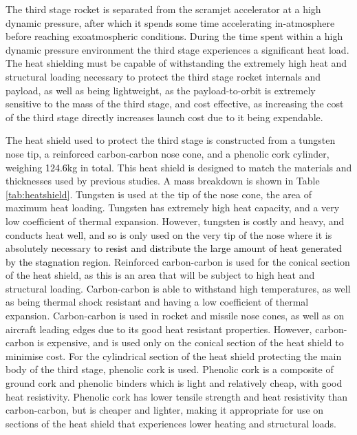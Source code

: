 The third stage rocket is separated from the scramjet accelerator at a high dynamic pressure, after which it spends some time accelerating in-atmosphere before reaching exoatmospheric conditions. During the time spent within a high dynamic pressure environment the third stage experiences a significant heat load. The heat shielding must be capable of withstanding the extremely high heat and structural loading necessary to protect the third stage rocket internals and payload, as well as being lightweight, as the payload-to-orbit is extremely sensitive to the mass of the third stage, and cost effective, as increasing the cost of the third stage directly increases launch cost due to it being expendable. 


The heat shield used to protect the third stage is constructed from a tungsten nose tip, a reinforced carbon-carbon nose cone, and a phenolic cork cylinder, weighing \textcolor{black}{124.6}kg in total. This heat shield is designed to match the materials and thicknesses used by previous studies\cite{Preller2017b}. A mass breakdown is shown in Table \ref{tab:heatshield}.
Tungsten is used at the tip of the nose cone, the area of maximum heat loading. Tungsten has extremely high heat capacity, and a very low coefficient of thermal expansion\cite{tungsten}. However, tungsten is costly and heavy, and conducts heat well, and so is only used on the very tip of the nose where it is absolutely necessary \textcolor{black}{to resist and distribute the large amount of heat generated by the stagnation region}. 
  Reinforced carbon-carbon is used for the conical section of the heat shield, as this is an area that will be subject to high heat and structural loading. Carbon-carbon is able to withstand high temperatures, as well as being thermal shock resistant and having a low coefficient of thermal expansion\cite{Fitzer}. Carbon-carbon is used in rocket and missile nose cones, as well as on aircraft leading edges due to its good heat resistant properties\cite{Fitzer}. However, carbon-carbon is expensive, and is used only on the conical section of the heat shield to minimise cost. For the cylindrical section of the heat shield protecting the main body of the third stage, phenolic cork is used. Phenolic cork is a composite of ground cork and phenolic binders which is light and relatively cheap, with good heat resistivity. Phenolic cork has lower tensile strength and heat resistivity than carbon-carbon\cite{Composites,Fitzer}, but is cheaper and lighter, making it appropriate for use on sections of the heat shield that experiences lower heating and structural loads. 


